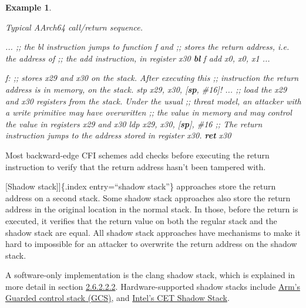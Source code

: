 \documentclass[
  a4paper,
]{report}
\newtheorem{example}{Example}
\newenvironment{Shaded}{}{}
\newcommand{\CommentTok}[1]{\textcolor[rgb]{0.38,0.63,0.69}{\textit{#1}}}
\newcommand{\FunctionTok}[1]{\textcolor[rgb]{0.02,0.16,0.49}{#1}}
\newcommand{\KeywordTok}[1]{\textcolor[rgb]{0.00,0.44,0.13}{\textbf{#1}}}
\newcommand{\NormalTok}[1]{#1}
\newcommand{\OperatorTok}[1]{\textcolor[rgb]{0.40,0.40,0.40}{#1}}
\begin{document}
\begin{example}

\label{}

\textup{Typical AArch64 call/return sequence.}

\begin{Shaded}
\begin{Highlighting}[]
\NormalTok{  ...}
  \CommentTok{;; the bl instruction jumps to function f and}
  \CommentTok{;; stores the return address, i.e. the address of}
  \CommentTok{;; the \textquotesingle{}add\textquotesingle{} instruction, in register x30}
  \KeywordTok{bl}\NormalTok{ f}
\NormalTok{  add x0}\OperatorTok{,}\NormalTok{ x0}\OperatorTok{,}\NormalTok{ x1}
\NormalTok{  ...}

\FunctionTok{f:}
  \CommentTok{;; stores x29 and x30 on the stack. After executing this}
  \CommentTok{;; instruction the return address is in memory, on the stack.}
\NormalTok{  stp x29}\OperatorTok{,}\NormalTok{ x30}\OperatorTok{,} \OperatorTok{[}\KeywordTok{sp}\OperatorTok{,} \CommentTok{\#16]!}
\NormalTok{  ...}
  \CommentTok{;; load the x29 and x30 registers from the stack. Under the usual}
  \CommentTok{;; threat model, an attacker with a write primitive may have overwritten}
  \CommentTok{;; the value in memory and may control the value in registers x29 and x30}
\NormalTok{  ldp x29}\OperatorTok{,}\NormalTok{ x30}\OperatorTok{,} \OperatorTok{[}\KeywordTok{sp}\OperatorTok{],} \CommentTok{\#16}
  \CommentTok{;; The return instruction jumps to the address stored in register x30.}
  \KeywordTok{ret}\NormalTok{ x30}
\end{Highlighting}
\end{Shaded}

\end{example}

Most backward-edge CFI schemes add checks before executing the return
instruction to verify that the return address hasn't been tampered with.

{[}Shadow stack{]}{]}\{.index entry=``shadow stack''\} approaches store
the return address on a second stack. Some shadow stack approaches also
store the return address in the original location in the normal stack.
In those, before the return is executed, it verifies that the return
value on both the regular stack and the shadow stack are equal. All
shadow stack approaches have mechanisms to make it hard to impossible
for an attacker to overwrite the return address on the shadow stack.

A software-only implementation is the clang shadow stack, which is
explained in more detail in section
\hyperref[sec:clang-shadow-stack]{2.6.2.2.2}. Hardware-supported shadow
stacks include
\href{https://community.arm.com/arm-community-blogs/b/architectures-and-processors-blog/posts/arm-a-profile-architecture-2022}{Arm's
Guarded control stack (GCS)}, and
\href{https://www.intel.com/content/www/us/en/content-details/785687/complex-shadow-stack-updates-intel-control-flow-enforcement-technology.html}{Intel's
CET Shadow Stack}.
\end{document}
